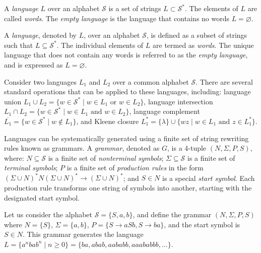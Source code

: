 A \emph{language} $L$ over an alphabet $\mathcal{S}$ is a set of strings $L \subset \mathcal{S}^{\ast}$. The elements of $L$ are called \emph{words}. The \emph{empty language} is the language that contains no words $L = \varnothing$. 

A \emph{language}, denoted by $L$, over an alphabet $\mathcal{S}$, is defined as a subset of strings such that $L \subseteq \mathcal{S}^{\ast}$. The individual elements of $L$ are termed as \emph{words}. The unique language that does not contain any words is referred to as the \emph{empty language}, and is expressed as $L = \varnothing$.

Consider two languages $L_1$ and $L_2$ over a common alphabet $\mathcal{S}$. There are several standard operations that can be applied to these languages, including: language union $L_1 \cup L_2 = \{ w \in \mathcal{S}^{\ast} \mid w \in L_1 \text{ or } w \in L_2 \}$, language intersection $L_1 \cap L_2 = \{ w \in \mathcal{S}^{\ast} \mid w \in L_1 \text{ and } w \in L_2 \}$, language complement $\overline{L_1} = \{ w \in \mathcal{S}^{\ast} \mid w \notin L_1 \}$, and Kleene closure $L_1^\ast = \{ \lambda \} \cup \{ wz \mid w \in L_1 \text{ and } z \in L_1^\ast \}$.

Languages can be systematically generated using a finite set of string rewriting rules known as grammars. A \emph{grammar}, denoted as $G$, is a 4-tuple $(N, \Sigma, P, S)$, where: $N \subseteq \mathcal{S}$ is a finite set of \emph{nonterminal symbols}; $\Sigma \subseteq \mathcal{S}$ is a finite set of \emph{terminal symbols}; $P$ is a finite set of \emph{production rules} in the form $( \Sigma \cup N )^\ast N ( \Sigma \cup N)^\ast \rightarrow (\Sigma \cup N)^\ast$; and $S \in N$ is a special \emph{start symbol}. Each production rule transforms one string of symbols into another, starting with the designated start symbol.

\begin{example}
\label{ex:context_free_grammar}
Let us consider the alphabet $\mathcal{S} = \{ S, a, b \}$, and define the grammar $(N, \Sigma, P, S)$ where $N = \{ S \}$, $\Sigma = \{ a, b \}$, $P = \{ S \rightarrow aSb, S \rightarrow ba \}$, and the start symbol is $S \in N$. This grammar generates the language $L = \{ a^nbab^n \mid n\geq0 \} = \{ ba, abab, aababb, aaababbb, \ldots \}$.
\end{example}

